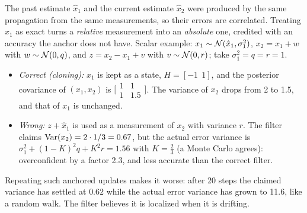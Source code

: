 \begin{solutions}
  \item The past estimate $\hat x_1$ and the current estimate $\hat x_2$ were produced by the same propagation from the same measurements, so their errors are correlated. Treating
        $\hat x_1$ as exact turns a \emph{relative} measurement into an \emph{absolute} one, credited with an accuracy the anchor does not have. Scalar example: $x_1 \sim \mathcal{N}(\hat x_1, \sigma_1^2)$,
        $x_2 = x_1 + w$ with $w \sim \mathcal{N}(0, q)$, and $z = x_2 - x_1 + v$ with $v \sim \mathcal{N}(0, r)$; take $\sigma_1^2 = q = r = 1$.
        \begin{itemize}
          \item \emph{Correct (cloning):} $x_1$ is kept as a state, $H = [-1\ \ 1]$, and the posterior covariance of $(x_1, x_2)$ is $\big[\begin{smallmatrix} 1 & 1 \\ 1 & 1.5\end{smallmatrix}\big]$.
                The variance of $x_2$ drops from 2 to 1.5, and that of $x_1$ is unchanged.
          \item \emph{Wrong:} $z + \hat x_1$ is used as a measurement of $x_2$ with variance $r$. The filter claims $\operatorname{Var}(x_2) = 2\cdot1/3 = 0.67$, but the actual error
                variance is $\sigma_1^2 + (1 - K)^2q + K^2r = 1.56$ with $K = \tfrac23$ (a Monte Carlo agrees): overconfident by a factor 2.3, and less accurate than the correct filter.
        \end{itemize}
        Repeating such anchored updates makes it worse: after 20 steps the claimed variance has settled at $0.62$ while the actual error variance has grown to
        11.6, like a random walk. The filter believes it is localized when it is drifting.
\end{solutions}
